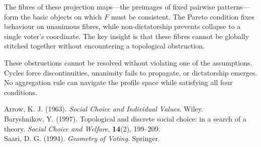 \begin{technical}
The fibres of these projection maps—the preimages of fixed pairwise patterns—form the basic objects on which \(F\) must be consistent. The Pareto condition fixes behaviour on unanimous fibres, while non-dictatorship prevents collapse to a single voter’s coordinate. The key insight is that these fibres cannot be globally stitched together without encountering a topological obstruction.

These obstructions cannot be resolved without violating one of the assumptions. Cycles force discontinuities, unanimity fails to propagate, or dictatorship emerges. No aggregation rule can navigate the profile space while satisfying all four conditions.

\techref
{\footnotesize
Arrow, K. J. (1963). \textit{Social Choice and Individual Values}. Wiley.\\
Baryshnikov, Y. (1997). Topological and discrete social choice: in a search of a theory. \textit{Social Choice and Welfare}, \textbf{14}(2), 199–209.\\
Saari, D. G. (1994). \textit{Geometry of Voting}. Springer.
}
\end{technical}
